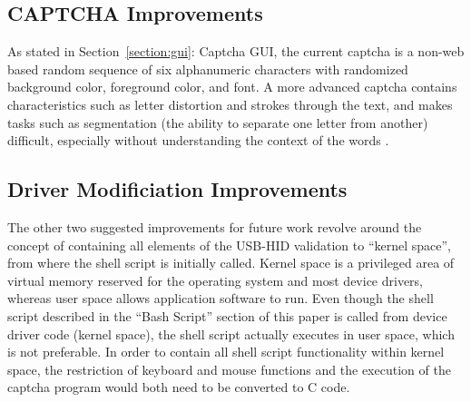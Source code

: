 \documentclass[pagenumbers]{ieee}
\begin{document}
\subsection{CAPTCHA Improvements}
\label{section:futureworkcaptcha}

As stated in Section~\ref{section:gui}: Captcha GUI, the current captcha is a non-web based random sequence of six alphanumeric characters with randomized background color, foreground color, and font. A more advanced captcha contains characteristics such as letter distortion and strokes through the text, and makes tasks such as segmentation (the ability to separate one letter from another) difficult, especially without understanding the context of the words \cite{captcha}.

\subsection{Driver Modificiation Improvements}
\label{section:futureworkdriver}

The other two suggested improvements for future work revolve around the concept of containing all elements of the USB-HID validation to ``kernel space'', from where the shell script is initially called. Kernel space is a privileged area of virtual memory reserved for the operating system and most device drivers, whereas user space allows application software to run. Even though the shell script described in the ``Bash Script'' section of this paper is called from device driver code (kernel space), the shell script actually executes in user space, which is not preferable. In order to contain all shell script functionality within kernel space, the restriction of keyboard and mouse functions and the execution of the captcha program would both need to be converted to C code. 
\end{document}
